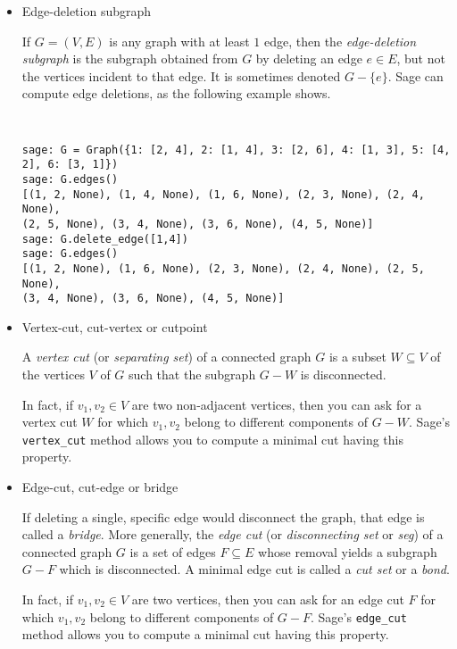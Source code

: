 \begin{itemize}
\item Edge-deletion subgraph

If $G = (V,E)$ is any graph with at least $1$ edge, then the
\emph{edge-deletion subgraph} is the subgraph obtained from $G$ by
deleting an edge $e \in E$, but not the vertices incident to that edge.
It is sometimes denoted $G - \{e\}$. Sage can compute edge deletions,
as the following example shows.
%
\begin{center}
\fontsize{9pt}{9pt}
\selectfont
\tt
\begin{lstlisting}
sage: G = Graph({1: [2, 4], 2: [1, 4], 3: [2, 6], 4: [1, 3], 5: [4, 2], 6: [3, 1]})
sage: G.edges()
[(1, 2, None), (1, 4, None), (1, 6, None), (2, 3, None), (2, 4, None),
(2, 5, None), (3, 4, None), (3, 6, None), (4, 5, None)]
sage: G.delete_edge([1,4])
sage: G.edges()
[(1, 2, None), (1, 6, None), (2, 3, None), (2, 4, None), (2, 5, None),
(3, 4, None), (3, 6, None), (4, 5, None)]
\end{lstlisting}
\end{center}

\item Vertex-cut, cut-vertex or cutpoint

A \emph{vertex cut} (or \emph{separating set}) of a connected graph
$G$ is a subset $W \subseteq V$ of the vertices $V$ of $G$ such that
the subgraph $G - W$ is disconnected.

In fact, if $v_1, v_2 \in V$ are two non-adjacent vertices, then you
can ask for a vertex cut $W$ for which $v_1, v_2$ belong to different
components of $G - W$. Sage's \verb!vertex_cut! method allows you to
compute a minimal cut having this property.

\item Edge-cut, cut-edge or bridge

If deleting a single, specific edge would disconnect the graph, that
edge is called a \emph{bridge}. More generally, the \emph{edge cut}
(or \emph{disconnecting set} or {\it seg}) of a connected graph $G$ is a set of
edges $F \subseteq E$ whose removal yields a subgraph $G - F$ which is
disconnected. A minimal edge cut is called a {\it cut set} or a {\it bond}.

In fact, if $v_1, v_2 \in V$ are two vertices, then you can ask for an
edge cut $F$ for which $v_1, v_2$ belong to different components of
$G - F$. Sage's \verb!edge_cut! method allows you to compute a minimal
cut having this property.
\end{itemize}


